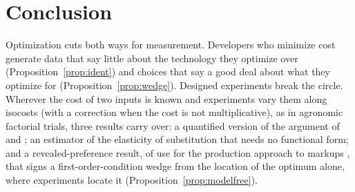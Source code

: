 
\section{Conclusion}\label{sec:concl}

Optimization cuts both ways for measurement. Developers who minimize cost generate data that say little about the
technology they optimize over (Proposition~\ref{prop:ident}) and choices that say a good deal about what they optimize
for (Proposition~\ref{prop:wedge}). Designed experiments break the circle. Wherever the cost of two inputs is known
and experiments vary them along isocosts (with a correction when the cost is not multiplicative), as in agronomic
factorial trials, three results carry over: a quantified version of the argument of \citet{marschak1944random} and
\citet{bond2005adjustment}; an estimator of the elasticity of substitution that needs no functional form; and a
revealed-preference result, of use for the production approach to markups \citep{deloecker2012markups}, that signs a
first-order-condition wedge from the location of the optimum alone, where experiments locate it
(Proposition~\ref{prop:modelfree}).

